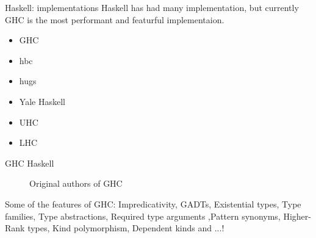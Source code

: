 \documentclass[pdf]{beamer}
\begin{document}
\begin{frame}{Haskell: implementations}
  Haskell has had many implementation, but currently GHC is the most performant and featurful implementaion.
  \begin{itemize}
  \item GHC
  \item hbc
  \item hugs
  \item Yale Haskell
  \item UHC
  \item LHC
  \end{itemize}
\end{frame}

\begin{frame}{GHC Haskell}
  \begin{figure}[H]
    \centering
    \hspace{0.2cm}
    \caption{Original authors of GHC}
  \end{figure}

  Some of the features of GHC:
  {\small Impredicativity, GADTs, Existential types, Type families,
  Type abstractions, Required type arguments ,Pattern synonyms, Higher-Rank types, Kind polymorphism,
  Dependent kinds and ...!}
\end{frame}
\end{document}
